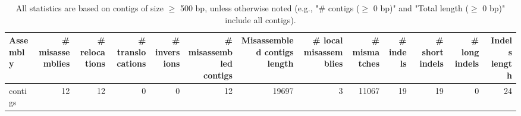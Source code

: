 \documentclass[12pt,a4paper]{article}
\begin{document}
\begin{table}[ht]
\begin{center}
\caption{All statistics are based on contigs of size $\geq$ 500 bp, unless otherwise noted (e.g., "\# contigs ($\geq$ 0 bp)" and "Total length ($\geq$ 0 bp)" include all contigs).}
\begin{tabular}{|l*{12}{|r}|}
\hline
Assembly & \# misassemblies &     \# relocations &     \# translocations &     \# inversions & \# misassembled contigs & Misassembled contigs length & \# local misassemblies & \# mismatches & \# indels &     \# short indels &     \# long indels & Indels length \\ \hline
contigs & 12 & 12 & 0 & 0 & 12 & 19697 & 3 & 11067 & 19 & 19 & 0 & 24 \\ \hline
\end{tabular}
\end{center}
\end{table}
\end{document}
